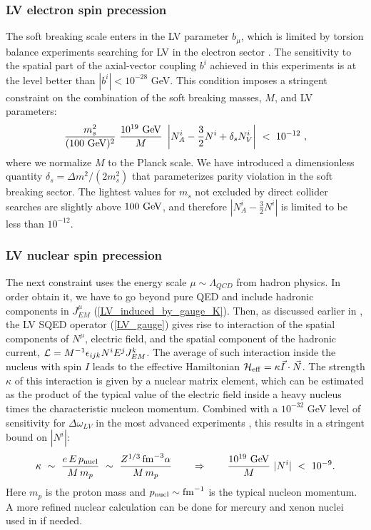 \documentclass[12pt]{revtex4}
\begin{document}
\subsubsection*{LV electron spin precession}


The soft  breaking scale enters in the LV parameter $b_\mu$, which is 
limited by torsion balance experiments searching for LV in the
electron sector \cite{Heckel:1999sy}. The sensitivity to the spatial
part of the axial-vector  
coupling $b^i$ achieved in this experiments is at the level better
than $|b^i| < 10^{-28}$ GeV. This condition imposes a stringent
constraint on the combination of the soft breaking masses, 
$M$, and LV parameters:
%
\begin{equation}
\frac{m_{s}^2}{(100~{\rm GeV})^2}~
\frac {10^{19}~{\rm GeV}}{M} ~ 
\left| N_A^i - \frac{3}{2} N^i + \delta_{s} N_V^i \right |
~<~10^{-12}~, 
\label{b_limit}
\end{equation}
%
where we normalize $M$ to the Planck scale. We have introduced a
dimensionless quantity  
$\delta_s = \Delta m^2/(2m_s^2)$ that parameterizes parity violation
in the soft breaking sector. The lightest values for $m_s$ not
excluded by direct collider searches are slightly above 
$100~{\rm GeV}$, and therefore $|N_A^i - \frac{3}{2} N^i |$ is limited
to be less than $10^{-12}$.  


\subsubsection*{LV nuclear spin precession}


The next constraint uses the energy scale $\mu \sim \Lambda_{QCD}$ from
hadron physics. In order obtain it, we have to go beyond pure QED and
include hadronic components in $J^\mu_{EM}$
(\ref{LV_induced_by_gauge_K}). Then, as discussed earlier in  
\cite{GrootNibbelink:2004za}, the LV SQED operator (\ref{LV_gauge})
gives rise to interaction of the spatial components of $N^\mu$,
electric field, and the spatial component  of the hadronic current, 
${\cal L} = M^{-1}\epsilon_{ijk} N^i E^j J_{EM}^k$.
The average of such interaction inside the nucleus with spin $I$ leads to 
the effective Hamiltonian 
$\mathcal{H}_{\rm eff}= \kappa \vec I\cdot \vec N$.
The strength $\kappa$ of this interaction is given by a nuclear matrix
element, which can be estimated as the product of the typical value of 
the electric field inside a heavy nucleus times the characteristic  
nucleon momentum. Combined with a $10^{-32}$ GeV level of sensitivity
for  $\Delta \omega_{LV}$ in the most advanced experiments
\cite{clock1,clock2}, this results in a stringent bound on $|N^i|$:
%
\begin{equation}
\kappa ~\sim~ \frac{e\, E \, p_{\rm nucl}}{M\, m_p} 
~\sim~ \frac{Z^{1/3}\, {\rm fm}^{-3}\alpha}{M \,m_p} 
\qquad \Rightarrow \qquad
\frac {10^{19}~{\rm GeV}}{M} ~ |N^i| ~<~ 10^{-9}.
\label{N_limit_nucl}
\end{equation}
%
Here $m_p$ is the proton mass and $p_{\rm nucl}\sim {\rm fm}^{-1}$ is
the typical nucleon momentum. A more refined nuclear calculation can
be done for mercury and xenon nuclei used in \cite{clock1,clock2} if needed.
\end{document}

